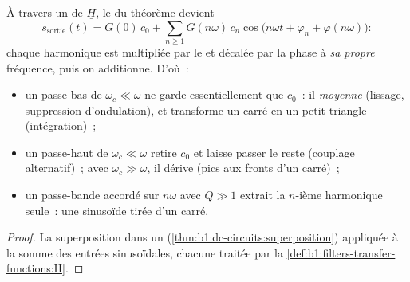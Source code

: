 \begin{proposition}\label{prop:b1:filters-transfer-functions:filtering}
À travers un  de  $\underline H$, le 
du théorème devient
\[
s_{\text{sortie}}(t) = G(0)\,c_0 + \sum_{n \geq 1} G(n\omega)\,c_n\cos\!\big(n\omega t + \varphi_n + \varphi(n\omega)\big):
\]
chaque harmonique est multipliée par le  et décalée par la phase à
\emph{sa propre} fréquence, puis on additionne. D'où~:
\begin{itemize}
  \item un passe-bas de $\omega_c \ll \omega$ ne garde essentiellement
        que $c_0$~: il \emph{moyenne} (lissage, suppression
        d'ondulation), et transforme un  carré en un petit
        triangle (intégration)~;
  \item un passe-haut de $\omega_c \ll \omega$ retire $c_0$ et laisse
        passer le reste (couplage alternatif)~; avec
        $\omega_c \gg \omega$, il dérive (pics aux fronts d'un carré)~;
  \item un passe-bande accordé sur $n\omega$ avec $Q \gg 1$ extrait la
        $n$-ième harmonique seule~: une sinusoïde tirée d'un carré.
\end{itemize}
\end{proposition}

\begin{proof}
La superposition dans un 
(\cref{thm:b1:dc-circuits:superposition}) appliquée à la somme des
entrées sinusoïdales, chacune traitée par la
\cref{def:b1:filters-transfer-functions:H}.
\end{proof}

